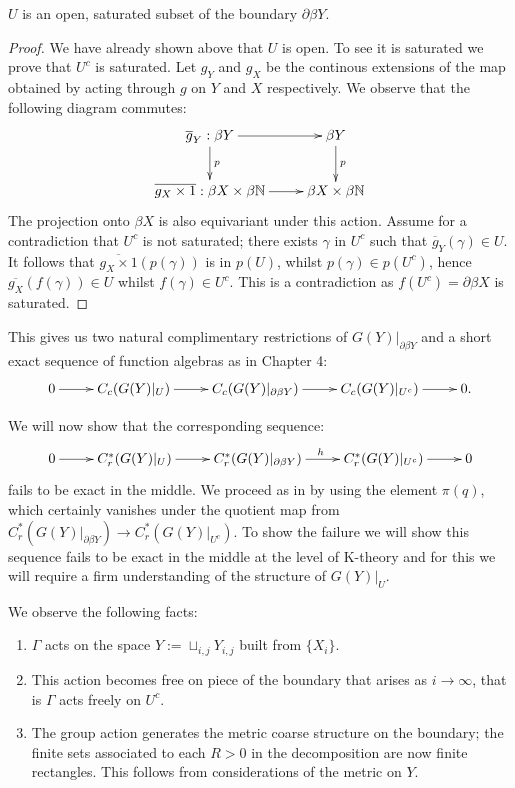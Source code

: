 \begin{example}
\begin{lemma}
$U$ is an open, saturated subset of the boundary $\partial\beta Y$. 
\end{lemma}
\begin{proof}
We have already shown above that $U$ is open. To see it is saturated we prove that $U^{c}$ is saturated. Let $g_{Y}$ and $g_{X}$ be the continous extensions of the map obtained by acting through $g$ on $Y$ and $X$ respectively. We observe that the following diagram commutes:
\begin{equation*}
\xymatrix{
\overline{g}_{Y}:\beta Y\ar[r]\ar[d]^{p} & \beta Y\ar[d]^{p}\\
\overline{g_{X} \times 1}:  \beta X \times \beta \mathbb{N} \ar[r] & \beta X \times \beta \mathbb{N}
}
\end{equation*}
The projection onto $\beta X$ is also equivariant under this action. Assume for a contradiction that $U^{c}$ is not saturated; there exists $\gamma$ in $U^{c}$ such that $\overline{g}_{Y}(\gamma) \in U$. It follows that $\overline{g_{X} \times 1}(p(\gamma))$ is in $p(U)$, whilst $p(\gamma) \in p(U^{c})$, hence $\overline{g_{X}}(f(\gamma))\in U$ whilst $f(\gamma) \in U^{c}$. This is a contradiction as $f(U^{c}) = \partial\beta X$ is saturated.
\end{proof}

This gives us two natural complimentary restrictions of $G(Y)|_{\partial\beta Y}$ and a short exact sequence of function algebras as in Chapter 4:
\begin{equation*}
\xymatrix{
0 \ar[r] & C_{c}(G(Y)|_{U}) \ar[r]& C_{c}(G(Y)|_{\partial\beta Y}) \ar[r] & C_{c}(G(Y)|_{U^{c}}) \ar[r] & 0.
}
\end{equation*}

We will now show that the corresponding sequence:
\begin{equation*}
\xymatrix{
0 \ar[r] & C^{*}_{r}(G(Y)|_{U}) \ar[r]& C_{r}^{*}(G(Y)|_{\partial\beta Y}) \ar[r]^{h} & C_{r}^{*}(G(Y)|_{U^{c}}) \ar[r] & 0
}
\end{equation*}
fails to be exact in the middle. We proceed as in \cite{explg1,MR1911663} by using the element $\pi(q)$, which certainly vanishes under the quotient map from $C^{*}_{r}(G(Y)|_{\partial\beta Y}) \rightarrow C^{*}_{r}(G(Y)|_{U^{c}})$. To show the failure we will show this sequence fails to be exact in the middle at the level of K-theory and for this we will require a firm understanding of the structure of $G(Y)|_{U}$.

We observe the following facts: 
\begin{enumerate}
\item $\Gamma$ acts on the space $Y:=\sqcup_{i,j}Y_{i,j}$ built from $\lbrace X_{i} \rbrace$.
\item This action becomes free on piece of the boundary that arises as $i \rightarrow \infty$, that is $\Gamma$ acts freely on $U^{c}$.
\item The group action generates the metric coarse structure on the boundary; the finite sets associated to each $R>0$ in the decomposition are now finite rectangles. This follows from considerations of the metric on $Y$.
\end{enumerate} 


\end{example}
